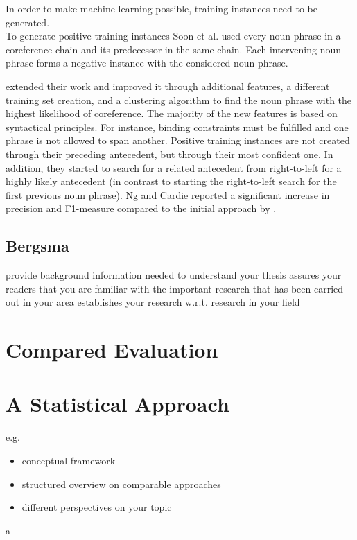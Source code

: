 In order to make machine learning possible, training instances need to be generated.\\
To generate positive training instances Soon et al. used every noun phrase in a coreference chain and its predecessor in the same chain. Each intervening noun phrase forms a negative instance with the considered noun phrase. 


\citep{ng2002improving} extended their work and improved it through additional features, a different training set creation, and a clustering algorithm to find the noun phrase with the highest likelihood of coreference. The majority of the new features is based on syntactical principles. For instance, binding constraints must be fulfilled and one phrase is not allowed to span another. Positive training instances are not created through their preceding antecedent, but through their most confident one. In addition, they started to search for a related antecedent from right-to-left for a highly likely antecedent (in contrast to starting the right-to-left search for the first previous noun phrase). Ng and Cardie reported a significant increase in precision and F1-measure compared to the initial approach by \citep{soon2001machine}.

\subsection{Bergsma}


provide background information needed to understand your thesis
assures your readers that you are familiar with the important research that has been carried out in your area
establishes your research w.r.t. research in your field

\section{Compared Evaluation}

\section{A Statistical Approach}

e.g.\
\begin{itemize}
  \item conceptual framework
  \item structured overview on comparable approaches
  \item different perspectives on your topic
\end{itemize}

 a